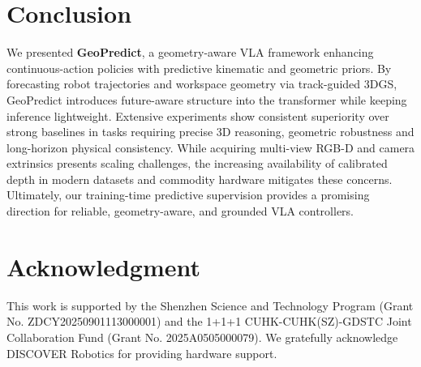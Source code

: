\section{Conclusion}
\label{sec:conclusion}

We presented \textbf{GeoPredict}, a geometry-aware VLA framework enhancing continuous-action policies with predictive kinematic and geometric priors. By forecasting robot trajectories and workspace geometry via track-guided 3DGS, GeoPredict introduces future-aware structure into the transformer while keeping inference lightweight. Extensive experiments show consistent superiority over strong baselines in tasks requiring precise 3D reasoning, geometric robustness and long-horizon physical consistency. While acquiring multi-view RGB-D and camera extrinsics presents scaling challenges, the increasing availability of calibrated depth in modern datasets and commodity hardware mitigates these concerns. Ultimately, our training-time predictive supervision provides a promising direction for reliable, geometry-aware, and grounded VLA controllers.



\section*{Acknowledgment}
{\sloppy
This work is supported by the Shenzhen Science and Technology Program (Grant No. ZDCY20250901113000001) and the 1+1+1 CUHK-CUHK(SZ)-GDSTC Joint Collaboration Fund (Grant No. 2025A0505000079). We gratefully acknowledge DISCOVER Robotics for providing hardware support.
\par}

